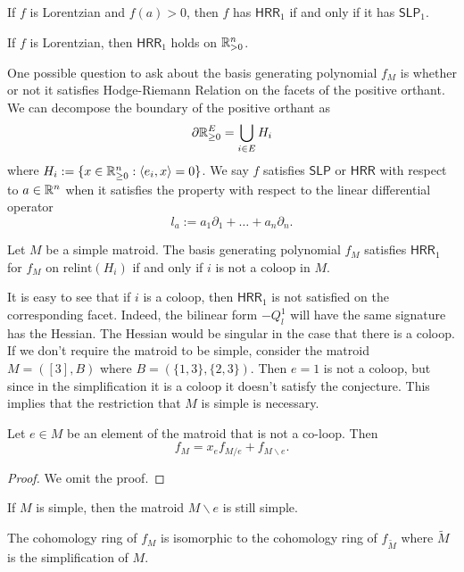 \documentclass[12pt]{article}
\begin{document}
\begin{lem}
	If $f$ is Lorentzian and $f(a) > 0$, then $f$ has $\mathsf{HRR}_1$ if and only if it has $\mathsf{SLP}_1$. 
\end{lem}

\begin{lem}
	If $f$ is Lorentzian, then $\mathsf{HRR}_1$ holds on $\mathbb{R}_{> 0}^n$. 
\end{lem}

One possible question to ask about the basis generating polynomial $f_M$ is whether or not it satisfies Hodge-Riemann Relation on the facets of the positive orthant. We can decompose the boundary of the positive orthant as 
\[
	\partial \mathbb{R}_{\geq 0}^E = \bigcup_{i \in E} H_i
\]
where $H_i := \{x \in \mathbb{R}_{\geq 0}^n : \langle e_i, x \rangle = 0\}$. We say $f$ satisfies $\mathsf{SLP}$ or $\mathsf{HRR}$ with respect to $a \in \mathbb{R}^n$ when it satisfies the property with respect to the linear differential operator
\[
	l_a := a_1 \partial_1 + \ldots + a_n \partial_n. 
\]

\begin{conj}
	Let $M$ be a simple matroid. The basis generating polynomial $f_M$ satisfies $\mathsf{HRR}_1$ for $f_M$ on $\text{relint}(H_i)$ if and only if $i$ is not a coloop in $M$. 
\end{conj}

It is easy to see that if $i$ is a coloop, then $\mathsf{HRR}_1$ is not satisfied on the corresponding facet. Indeed, the bilinear form $-Q^1_l$ will have the same signature has the Hessian. The Hessian would be singular in the case that there is a coloop. If we don't require the matroid to be simple, consider the matroid $M = ([3], B)$ where $B = (\{1, 3\}, \{2, 3\})$. Then $e = 1$ is not a coloop, but since in the simplification it is a coloop it doesn't satisfy the conjecture. This implies that the restriction that $M$ is simple is necessary. 

\begin{fact}
	Let $e \in M$ be an element of the matroid that is not a co-loop. Then 
	\[
		f_M = x_e f_{M / e} + f_{M \backslash e}.
	\]
\end{fact}
\begin{proof}
	We omit the proof. 
\end{proof}

If $M$ is simple, then the matroid $M \backslash e$ is still simple. 

\begin{fact}
	The cohomology ring of $f_M$ is isomorphic to the cohomology ring of $f_{\widetilde{M}}$ where $\widetilde{M}$ is the simplification of $M$. 
\end{fact}
\end{document}
